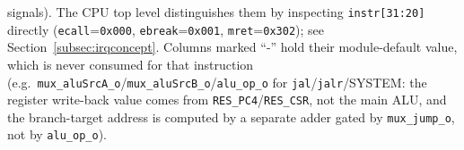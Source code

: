 signals). The CPU top level distinguishes them by inspecting
\texttt{instr[31:20]} directly (\texttt{ecall}=\texttt{0x000},
\texttt{ebreak}=\texttt{0x001}, \texttt{mret}=\texttt{0x302}); see
Section~\ref{subsec:irqconcept}. Columns marked ``-'' hold their
module-default value, which is never consumed for that instruction (e.g.\
\texttt{mux\_aluSrcA\_o}/\texttt{mux\_aluSrcB\_o}/\texttt{alu\_op\_o} for
\texttt{jal}/\texttt{jalr}/SYSTEM: the register write-back value comes
from \texttt{RES\_PC4}/\texttt{RES\_CSR}, not the main ALU, and the
branch-target address is computed by a separate adder gated by
\texttt{mux\_jump\_o}, not by \texttt{alu\_op\_o}).\normalsize

